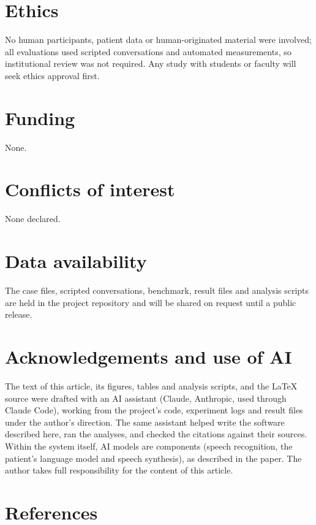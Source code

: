 \documentclass{article}
\begin{document}
\section*{Ethics}
No human participants, patient data or human-originated material were involved; all evaluations used scripted conversations and automated measurements, so institutional review was not required. Any study with students or faculty will seek ethics approval first.

\section*{Funding}
None.

\section*{Conflicts of interest}
None declared.

\section*{Data availability}
The case files, scripted conversations, benchmark, result files and analysis scripts are held in the project repository and will be shared on request until a public release.

\section*{Acknowledgements and use of AI}
The text of this article, its figures, tables and analysis scripts, and the \LaTeX{} source were
drafted with an AI assistant (Claude, Anthropic, used through Claude Code), working from the project's code, experiment logs and result
files under the author's direction. The same assistant helped write the software described here, ran the analyses, and checked the
citations against their sources. Within the system itself, AI models are components (speech recognition, the patient's language model and speech synthesis), as described in the paper. The author takes full responsibility for the content of this article.

\section*{References}
\end{document}
